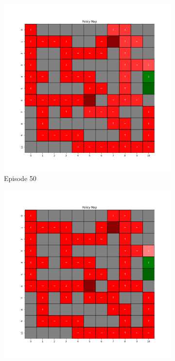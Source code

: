 \documentclass{assignment}
\begin{document}
\begin{figure}[H]
\begin{subfigure}{0.3\textwidth}
        \includegraphics[width=\textwidth]{figures/policy_q/gamma_sweep/policy_alpha_0.1_gamma_0.5_epsilon_0.2_iteration_50.png}
    \caption{Episode 50}
    \end{subfigure}\hfill
    \begin{subfigure}{0.3\textwidth}
        \includegraphics[width=\textwidth]{figures/policy_q/gamma_sweep/policy_alpha_0.1_gamma_0.5_epsilon_0.2_iteration_100.png}

\end{subfigure}
\end{figure}
\end{document}
